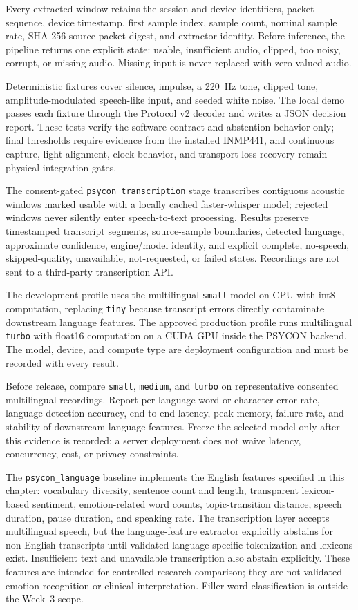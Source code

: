 Every extracted window retains the session and device identifiers, packet sequence, device timestamp, first sample index, sample count, nominal sample rate, SHA-256 source-packet digest, and extractor identity. Before inference, the pipeline returns one explicit state: usable, insufficient audio, clipped, too noisy, corrupt, or missing audio. Missing input is never replaced with zero-valued audio.

Deterministic fixtures cover silence, impulse, a 220~Hz tone, clipped tone, amplitude-modulated speech-like input, and seeded white noise. The local demo passes each fixture through the Protocol v2 decoder and writes a JSON decision report. These tests verify the software contract and abstention behavior only; final thresholds require evidence from the installed INMP441, and continuous capture, light alignment, clock behavior, and transport-loss recovery remain physical integration gates.

The consent-gated \texttt{psycon\_transcription} stage transcribes contiguous acoustic windows marked usable with a locally cached faster-whisper model; rejected windows never silently enter speech-to-text processing. Results preserve timestamped transcript segments, source-sample boundaries, detected language, approximate confidence, engine/model identity, and explicit complete, no-speech, skipped-quality, unavailable, not-requested, or failed states. Recordings are not sent to a third-party transcription API.

The development profile uses the multilingual \texttt{small} model on CPU with int8 computation, replacing \texttt{tiny} because transcript errors directly contaminate downstream language features. The approved production profile runs multilingual \texttt{turbo} with float16 computation on a CUDA GPU inside the PSYCON backend. The model, device, and compute type are deployment configuration and must be recorded with every result.

Before release, compare \texttt{small}, \texttt{medium}, and \texttt{turbo} on representative consented multilingual recordings. Report per-language word or character error rate, language-detection accuracy, end-to-end latency, peak memory, failure rate, and stability of downstream language features. Freeze the selected model only after this evidence is recorded; a server deployment does not waive latency, concurrency, cost, or privacy constraints.

The \texttt{psycon\_language} baseline implements the English features specified in this chapter: vocabulary diversity, sentence count and length, transparent lexicon-based sentiment, emotion-related word counts, topic-transition distance, speech duration, pause duration, and speaking rate. The transcription layer accepts multilingual speech, but the language-feature extractor explicitly abstains for non-English transcripts until validated language-specific tokenization and lexicons exist. Insufficient text and unavailable transcription also abstain explicitly. These features are intended for controlled research comparison; they are not validated emotion recognition or clinical interpretation. Filler-word classification is outside the Week~3 scope.

